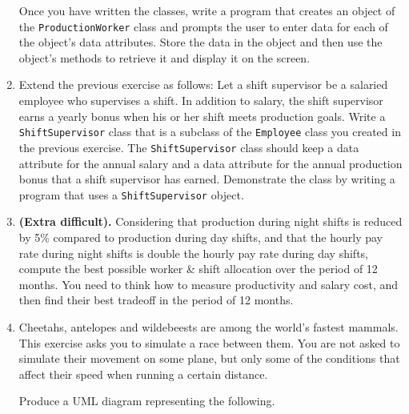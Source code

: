 \documentclass[a4paper,12pt]{article}
\begin{document}
\begin{enumerate}[label=10ø.\arabic*,start=0]
  Once you have written the classes, write a program that creates an object of the \texttt{ProductionWorker} class and prompts the user to enter data for each of the object's data attributes. Store the data in the object and then use the object's methods to retrieve it and display it on the screen.
  
\item Extend the previous exercise as follows: Let a shift supervisor be a salaried employee who supervises a shift. In addition to salary, the shift supervisor earns a yearly bonus when his or her shift meets production goals. Write a \texttt{ShiftSupervisor} class that is a subclass of the \texttt{Employee} class you created in the previous exercise. The \texttt{ShiftSupervisor} class should keep a data attribute for the annual salary and a data attribute for the annual production bonus that a shift supervisor has earned. Demonstrate the class by writing a program that uses a \texttt{ShiftSupervisor} object.
  
\item \textbf{(Extra difficult).} Considering that production during night shifts is reduced by 5\% compared to production during day shifts, and that the hourly pay rate during night shifts is double the hourly pay rate during day shifts, compute the best possible worker \& shift allocation over the period of 12 months. You need to think how to measure productivity and salary cost, and then find their best tradeoff in the period of 12 months.
  
\item Cheetahs, antelopes and wildebeests are among the world's fastest mammals. This exercise asks you to simulate a race between them. You are not asked to simulate their movement on some plane, but only some of the conditions that affect their speed when running a certain distance. 
  
  Produce a UML diagram representing the following.
  

\end{enumerate}
\end{document}
